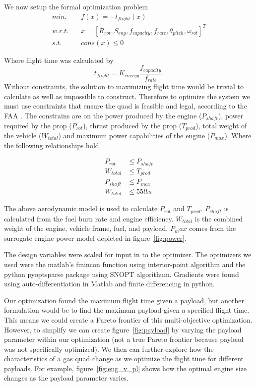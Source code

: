 \documentclass[letterpaper, 10 pt, conference]{ieeeconf}  %
\newcommand{\of}[1]{\ensuremath{\left(#1\right)}}
\begin{document}
We now setup the formal optimization problem
\begin{equation}
	\begin{split}
		min. & \quad f\of{x} = -t_{flight}\of{x} \\
		w.r.t. & \quad x = [R_{rot}, S_{eng}, f_{capacity}, f_{rate}, \theta_{pitch}, \omega_{rot}]^T \\
		s.t. & \quad cons\of{x} \leq 0 
	\end{split}
	\label{eq:objective}
\end{equation}

Where flight time was calculated by 
\[
	t_{flight} = K_{energy}\frac{f_{capacity}}{f_{rate}}.
\]
Without constraints, the solution to maximizing flight time would be trivial to calculate as well as impossible to construct. Therefore to optimize the system we must use constraints that ensure the quad is feasible and legal, according to the FAA \cite{faa2016}. The constrains are on the power produced by the engine ($P_{shaft}$), power required by the prop ($P_{rot}$), thrust produced by the prop ($T_{prod}$), total weight of the vehicle ($W_{total}$) and maximum power capabilities of the engine ($P_{max}$). Where the following relationships hold

\[
	\begin{split}
	P_{rot} & \leq P_{shaft} \\
	W_{total} & \leq T_{prod} \\ 
	P_{shaft} & \leq P_{max} \\
	W_{total} & \leq 55 lbs
	\end{split}
\]

The above aerodynamic model is used to calculate $P_{rot}$ and $T_{prod}$. $P_{shaft}$ is calculated from the fuel burn rate and engine efficiency. $W_{total}$ is the combined weight of the engine, vehicle frame, fuel, and payload. $P_max$ comes from the surrogate engine power model depicted in figure~\ref{fig:power}.

The design variables were scaled for input in to the optimizer. The optimizers we used were the matlab's fmincon function using interior-point algorithm and the python pyoptsparse package using SNOPT algorithum. Gradients were found using auto-differentiation in Matlab and finite differencing in python. 

Our optimization found the maximum flight time given a payload, but another formulation would be to find the maximum payload given a specified flight time. This means we could create a Pareto frontier of this multi-objective optimization. However, to simplify we can create figure~\ref{fig:payload} by varying the payload parameter within our optimization (not a true Pareto frontier because payload was not specifically optimized). We then can further explore how the characteristics of a gas quad change as we optimize the flight time for different payloads. For example, figure~\ref{fig:eng_v_pl} shows how the optimal engine size changes as the payload parameter varies. 
\end{document}
